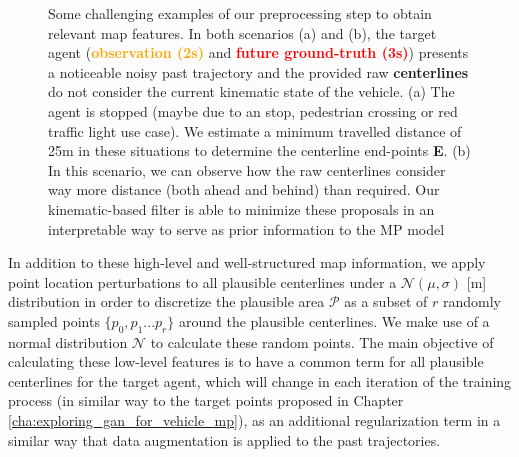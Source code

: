 \begin{figure}[t!]
	\begin{subfigure}{0.48\textwidth}
		\caption{}
	\end{subfigure}
	\hfill
	\begin{subfigure}{0.48\textwidth}
		\caption{}
	\end{subfigure}
	
	\captionsetup{justification=justified}
	\caption[Some challenging examples of our preprocessing step to obtain relevant map features]{Some challenging examples of our preprocessing step to obtain relevant map features. In both scenarios (a) and (b), the target agent (\textbf{\textcolor{orange}{observation (2s)}} and \textbf{\textcolor{red}{future ground-truth (3s)}}) presents a noticeable noisy past trajectory and the provided raw \textbf{centerlines} do not consider the current kinematic state of the vehicle. (a) The agent is stopped (maybe due to an stop, pedestrian crossing or red traffic light use case). We estimate a minimum travelled distance of 25m in these situations to determine the centerline end-points \textbf{E}. (b) In this scenario, we can observe how the raw centerlines consider way more distance (both ahead and behind) than required. Our kinematic-based filter is able to minimize these proposals in an interpretable way to serve as prior information to the MP model
	}
	\label{fig:chapter_6_Efficient_Baselines/efficient_baselines_hdmap_filtered_examples}
\end{figure}

In addition to these high-level and well-structured map information, we apply point location perturbations to all plausible centerlines under a $\mathcal{N}(\mu, \sigma)$ [m] distribution \cite{ye2021tpcn} in order to discretize the plausible area $\mathcal{P}$ as a subset of $r$ randomly sampled points $\{p_0 , p_1 ... p_r\}$ around the plausible centerlines. We make use of a normal distribution $\mathcal{N}$ to calculate these random points. The main objective of calculating these low-level features is to have a common term for all plausible centerlines for the target agent, which will change in each iteration of the training process (in similar way to the target points proposed in Chapter \ref{cha:exploring_gan_for_vehicle_mp}), as an additional regularization term in a similar way that data augmentation is applied to the past trajectories.

